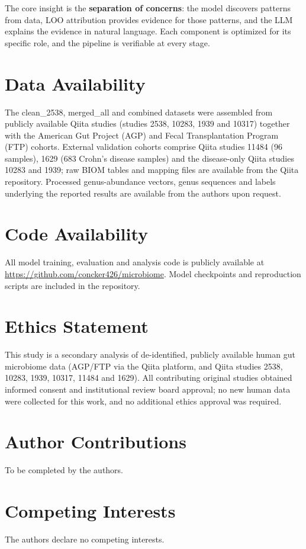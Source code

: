 \documentclass[11pt,a4paper]{article}
\begin{document}
The core insight is the \textbf{separation of concerns}: the model discovers patterns from data, LOO attribution provides evidence for those patterns, and the LLM explains the evidence in natural language. Each component is optimized for its specific role, and the pipeline is verifiable at every stage.

\section*{Data Availability}
The clean\_2538, merged\_all and combined datasets were assembled from publicly available Qiita studies (studies 2538, 10283, 1939 and 10317) together with the American Gut Project (AGP) and Fecal Transplantation Program (FTP) cohorts. External validation cohorts comprise Qiita studies 11484 (96 samples), 1629 (683 Crohn's disease samples) and the disease-only Qiita studies 10283 and 1939; raw BIOM tables and mapping files are available from the Qiita repository. Processed genus-abundance vectors, genus sequences and labels underlying the reported results are available from the authors upon request.

\section*{Code Availability}
All model training, evaluation and analysis code is publicly available at \url{https://github.com/concker426/microbiome}. Model checkpoints and reproduction scripts are included in the repository.

\section*{Ethics Statement}
This study is a secondary analysis of de-identified, publicly available human gut microbiome data (AGP/FTP via the Qiita platform, and Qiita studies 2538, 10283, 1939, 10317, 11484 and 1629). All contributing original studies obtained informed consent and institutional review board approval; no new human data were collected for this work, and no additional ethics approval was required.

\section*{Author Contributions}
To be completed by the authors.

\section*{Competing Interests}
The authors declare no competing interests.
\end{document}
